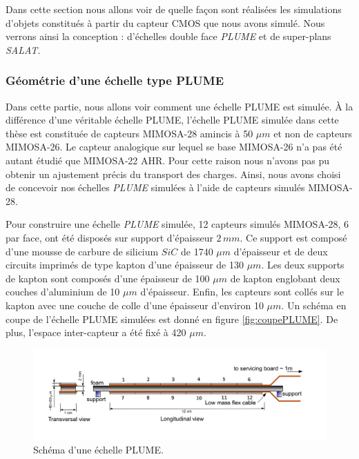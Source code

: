    Dans cette section nous allons voir de quelle fa\c{c}on sont r\'ealis\'ees les simulations d'objets constitu\'es \`a partir du capteur CMOS que nous avons simul\'e. Nous verrons ainsi la conception : d'\'echelles double face \textit{PLUME} et de super-plans \textit{SALAT}.
   
   \subsubsection{Géométrie d'une échelle type PLUME}
    
    Dans cette partie, nous allons voir comment une \'echelle PLUME est simul\'ee. \`A la diff\'erence d'une v\'eritable \'echelle PLUME, l'\'echelle PLUME simul\'ee dans cette th\`ese est constitu\'ee de capteurs MIMOSA-28 amincis \`a 50 $\mu m$ et non de capteurs MIMOSA-26. Le capteur analogique sur lequel se base MIMOSA-26 n'a pas \'et\'e autant \'etudié que MIMOSA-22 AHR. Pour cette raison nous n'avons pas pu obtenir un ajustement pr\'ecis du transport des charges. Ainsi, nous avons choisi de concevoir nos \'echelles \textit{PLUME} simul\'ees \`a l'aide de capteurs simul\'es MIMOSA-28.
    
    \medskip
    
    Pour construire une \'echelle \textit{PLUME} simul\'ee, 12 capteurs simul\'es MIMOSA-28, 6 par face, ont \'et\'e dispos\'es sur support d'\'epaisseur $2 \, mm$. Ce support est compos\'e d'une mousse de carbure de silicium $SiC$ de 1740 $\mu m$ d'\'epaisseur et de deux circuits imprim\'es de type kapton d'une \'epaisseur de 130 $\mu m$. Les deux supports de kapton sont compos\'es d'une \'epaisseur de 100 $\mu m$ de kapton englobant deux couches d'aluminium de 10 $\mu m$ d'\'epaisseur. Enfin, les capteurs sont coll\'es sur le kapton avec une couche de colle d'une \'epaisseur d'environ 10 $\mu m$. Un sch\'ema en coupe de l'\'echelle PLUME simul\'ees est donn\'e en figure \ref{fig:coupePLUME}. De plus, l'espace inter-capteur a \'et\'e fix\'e \`a 420 $\mu m$.
    
    \begin{figure}[!htb]
     \begin{center} 
      \includegraphics[scale=0.45]{./figures/plume_schema.png}
      \caption{Schéma d'une \'echelle PLUME.}
     \end{center}
    \end{figure}
    
